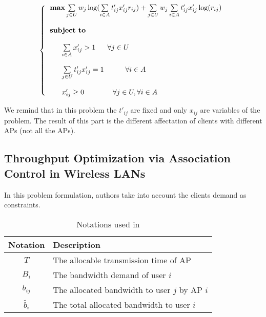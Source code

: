 \documentclass[journal,transmag]{IEEEtran}
\begin{document}
\begin{footnotesize}
\begin{equation}
\left\{
\begin{tabular}{l} 
$\textbf{max}  \sum\limits_{j \in U}  w_j \log (\sum\limits_{i \in A} t'_{ij} x'_{ij} r_{ij}) + \sum\limits_{j \in U} w_j \sum\limits_{i \in A} t'_{ij} x'_{ij} \log (r_{ij}) $ \\         
\\
\textbf{subject to} \\

\\
~~~~~$ \sum\limits_{i \in A} x'_{ij} > 1 $ ~~~ $\forall j \in U $  \\

\\
~~~~~$ \sum\limits_{j \in U} t'_{ij} x'_{ij} = 1 ~~~~~~~~~ \forall i \in A $ \\ 

\\
~~~~~$ x'_{ij} \geq 0   ~~~~~~~~~~~~ \forall j \in U, \forall i \in A  $ \\

\end{tabular}
\right.
\end{equation}
\end{footnotesize}    
 
We remind that in this problem the $t'_{ij}$ are fixed and only $x_{ij}$ are variables of the problem. The result of this part is the different affectation of clients with different APs (not all the APs). 

\subsection{Throughput Optimization via Association Control in Wireless LANs \cite{16throughput_optimisation_association_bandwidth}}
In this problem formulation, authors take into account the clients demand as constraints.

\begin{center} 
\begin{table}[htbp]
\centering
\begin{tabular}{|c|l|} %
\hline
Notation 		& Description \\
\hline
$T$ 				& The allocable transmission time of AP \\
$B_i$			& The bandwidth demand of user $i$\\
$b_{ij}$			& The allocated bandwidth to user $j$ by AP $i$ \\
$\tilde{b_i}$	& The total allocated bandwidth to user $i$\\
\hline
\end{tabular}
\label{problem_notations in 16}
\caption{Notations used in \cite{16throughput_optimisation_association_bandwidth}}
\end{table}
\end{center}
\end{document}

